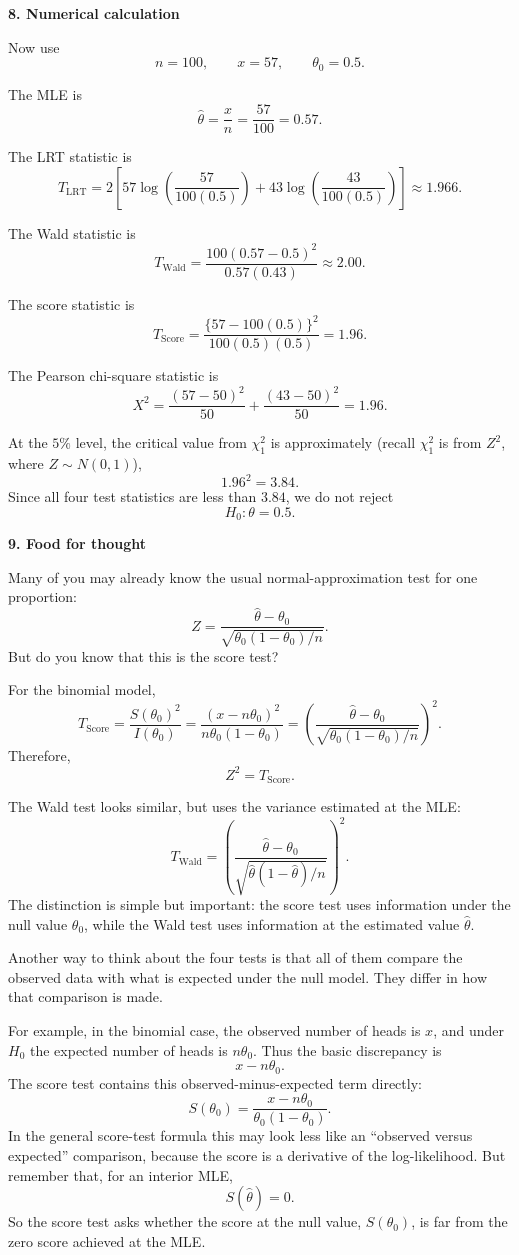 \documentclass[12pt]{article}
\begin{document}
{\bf 8. Numerical calculation}

Now use
\[
n=100,
\qquad
x=57,
\qquad
\theta_0=0.5.
\]

The MLE is
\[
\hat\theta=\frac{x}{n}=\frac{57}{100}=0.57.
\]

The LRT statistic is
\[
T_{\mathrm{LRT}}
=2\left[
57\log\left(\frac{57}{100(0.5)}\right)
+43\log\left(\frac{43}{100(0.5)}\right)
\right]
\approx 1.966.
\]

The Wald statistic is
\[
T_{\mathrm{Wald}}
=\frac{100(0.57-0.5)^2}{0.57(0.43)}
\approx 2.00.
\]

The score statistic is
\[
T_{\mathrm{Score}}
=\frac{\{57-100(0.5)\}^2}{100(0.5)(0.5)}
=1.96.
\]

The Pearson chi-square statistic is
\[
X^2
=\frac{(57-50)^2}{50}+\frac{(43-50)^2}{50}
=1.96.
\]

At the $5\%$ level, the critical value from $\chi^2_1$ is approximately (recall $\chi^2_1$ is from $Z^2$, where $Z\sim N(0,1)$),
\[
1.96^2=3.84.
\]
Since all four test statistics are less than $3.84$, we do not reject
\[
H_0:\theta=0.5.
\]

{\bf 9. Food for thought}

Many of you may already know the usual normal-approximation test for one proportion:
\[
Z
=
\frac{\hat\theta-\theta_0}
{\sqrt{\theta_0(1-\theta_0)/n}}.
\]
But do you know that this is the score test?

For the binomial model,
\[
T_{\mathrm{Score}}
=
\frac{S(\theta_0)^2}{I(\theta_0)}
=
\frac{(x-n\theta_0)^2}{n\theta_0(1-\theta_0)}
=
\left(
\frac{\hat\theta-\theta_0}
{\sqrt{\theta_0(1-\theta_0)/n}}
\right)^2.
\]
Therefore,
\[
Z^2=T_{\mathrm{Score}}.
\]

The Wald test looks similar, but uses the variance estimated at the MLE:
\[
T_{\mathrm{Wald}}
=
\left(
\frac{\hat\theta-\theta_0}
{\sqrt{\hat\theta(1-\hat\theta)/n}}
\right)^2.
\]
The distinction is simple but important: the score test uses information under the null value $\theta_0$, while the Wald test uses information at the estimated value $\hat\theta$.


Another way to think about the four tests is that all of them compare the observed data with what is expected under the null model. They differ in how that comparison is made.

For example, in the binomial case, the observed number of heads is $x$, and under $H_0$ the expected number of heads is $n\theta_0$. Thus the basic discrepancy is
\[
x-n\theta_0.
\]
The score test contains this observed-minus-expected term directly:
\[
S(\theta_0)=\frac{x-n\theta_0}{\theta_0(1-\theta_0)}.
\]
In the general score-test formula this may look less like an ``observed versus expected'' comparison, because the score is a derivative of the log-likelihood. But remember that, for an interior MLE,
\[
S(\hat\theta)=0.
\]
So the score test asks whether the score at the null value, $S(\theta_0)$, is far from the zero score achieved at the MLE.
\end{document}
